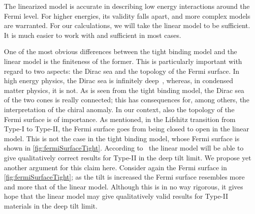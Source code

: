 



The linearized model is accurate in describing low energy interactions around the Fermi level.
For higher energies, its validity falls apart, and more complex models are warranted.
For our calculations, we will take the linear model to be sufficient.
It is much easier to work with and sufficient in most cases.

\label{sec:tilt:fermisurface-paragraph}
One of the most obvious differences between the tight binding model and the linear model is the finiteness of the former.
This is particularly important with regard to two aspects: the Dirac sea and the topology of the Fermi surface.
In high energy physics, the Dirac sea is infinitely deep~\cites{burkovTopologicalSemimetals2016,vozmedianoTheoreticalPhysicsColloquium2021}, whereas, in condensed matter physics, it is not.
As is seen from the tight binding model, the Dirac sea of the two cones is really connected;
this has consequences for, among others, the interpretation of the chiral anomaly.
In our context, also the topology of the Fermi surface is of importance.
As mentioned, in the Lifshitz transition from Type-I to Type-II, the Fermi surface goes from being closed to open in the linear model.
This is not the case in the tight binding model, whose Fermi surface is shown in \cref{fig:fermiSurfaceTight}.
According to~\textcite{ferreirosAnomalousNernstThermal2017} the linear model will be able to give qualitatively correct results for Type-II in the deep tilt limit.
We propose yet another argument for this claim here.
Consider again the Fermi surface in \cref{fig:fermiSurfaceTight};
as the tilt is increased the Fermi surface resembles more and more that of the linear model.
Although this is in no way rigorous, it gives hope that the linear model may give qualitatively valid results for Type-II materials in the deep tilt limit.

